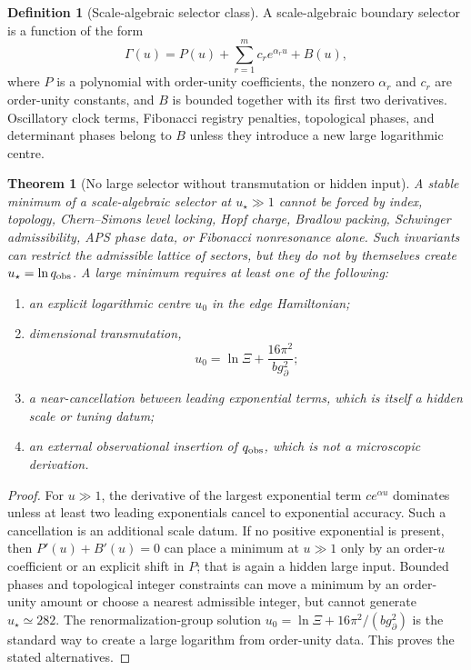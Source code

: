 \documentclass[aps,prd,reprint,nofootinbib,superscriptaddress,floatfix]{revtex4-2}
\numberwithin{equation}{section}
\theoremstyle{definition}
\newtheorem{definition}{Definition}[section]
\theoremstyle{plain}
\newtheorem{theorem}{Theorem}[section]
\begin{document}
\begin{definition}[Scale-algebraic selector class]
A scale-algebraic boundary selector is a function of the form
\begin{equation}
\Gamma(u)=P(u)+\sum_{r=1}^{m}c_r e^{\alpha_r u}
          +B(u),
\end{equation}
where \(P\) is a polynomial with order-unity coefficients, the nonzero
\(\alpha_r\) and \(c_r\) are order-unity constants, and \(B\) is bounded
together with its first two derivatives.  Oscillatory clock terms, Fibonacci
registry penalties, topological phases, and determinant phases belong to
\(B\) unless they introduce a new large logarithmic centre.
\end{definition}

\begin{theorem}[No large selector without transmutation or hidden input]
\label{thm:no-large-selector}
A stable minimum of a scale-algebraic selector at \(u_\star\gg1\) cannot be
forced by index, topology, Chern--Simons level locking, Hopf charge, Bradlow
packing, Schwinger admissibility, APS phase data, or Fibonacci nonresonance
alone.  Such invariants can restrict the admissible lattice of sectors, but
they do not by themselves create \(u_\star=\ln q_{\rm obs}\).  A large
minimum requires at least one of the following:
\begin{enumerate}
\item an explicit logarithmic centre \(u_0\) in the edge Hamiltonian;
\item dimensional transmutation,
\[
u_0=\ln\Xi+\frac{16\pi^2}{b g_\partial^2};
\]
\item a near-cancellation between leading exponential terms, which is itself
a hidden scale or tuning datum;
\item an external observational insertion of \(q_{\rm obs}\), which is not a
microscopic derivation.
\end{enumerate}
\end{theorem}

\begin{proof}
For \(u\gg1\), the derivative of the largest exponential term
\(c e^{\alpha u}\) dominates unless at least two leading exponentials cancel
to exponential accuracy.  Such a cancellation is an additional scale datum.
If no positive exponential is present, then \(P'(u)+B'(u)=0\) can place a
minimum at \(u\gg1\) only by an order-\(u\) coefficient or an explicit shift
in \(P\); that is again a hidden large input.  Bounded phases and topological
integer constraints can move a minimum by an order-unity amount or choose a
nearest admissible integer, but cannot generate \(u_\star\simeq282\).  The
renormalization-group solution \(u_0=\ln\Xi+16\pi^2/(b g_\partial^2)\) is the
standard way to create a large logarithm from order-unity data.  This proves
the stated alternatives.
\end{proof}
\end{document}
